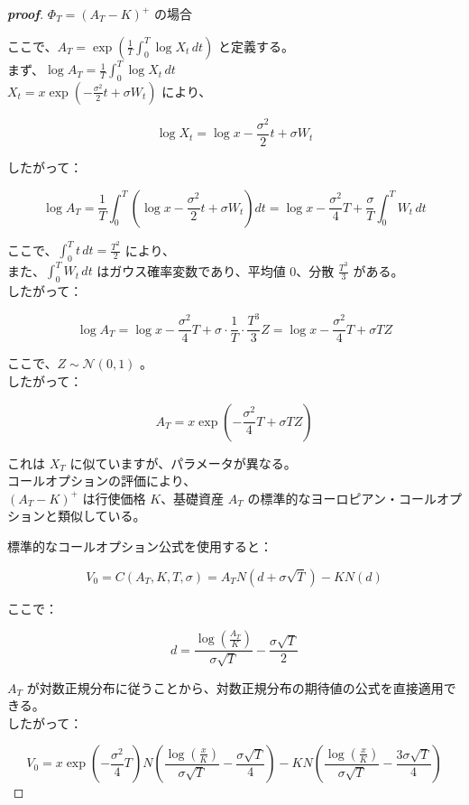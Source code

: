 \documentclass[a4paper,11pt]{jsarticle}
\begin{document}
\begin{proof}[\textbf{proof}]
$\Phi_T = (A_T - K)^+$ の場合

  ここで、$A_T = \exp\left(\frac{1}{T} \int_0^T \log X_t \, dt\right)$ と定義する。  \\ 
  
  まず、$\log A_T = \frac{1}{T} \int_0^T \log X_t \, dt$ \\  
  
  $X_t = x \exp\left(-\frac{\sigma^2}{2}t + \sigma W_t\right)$ により、  
  
  \[  
  \log X_t = \log x - \frac{\sigma^2}{2}t + \sigma W_t  
  \]  
  
  したがって：  
  
  \[  
  \log A_T = \frac{1}{T} \int_0^T \left(\log x - \frac{\sigma^2}{2}t + \sigma W_t\right) dt = \log x - \frac{\sigma^2}{4}T + \frac{\sigma}{T} \int_0^T W_t \, dt  
  \]  
  
  ここで、$\int_0^T t \, dt = \frac{T^2}{2}$ により、\\  
  
  また、$\int_0^T W_t \, dt$ はガウス確率変数であり、平均値 0、分散 $\frac{T^3}{3}$ がある。\\  
  
  したがって：  
  
  \[  
  \log A_T = \log x - \frac{\sigma^2}{4}T + \sigma \cdot \frac{1}{T} \cdot \frac{T^3}{3} Z = \log x - \frac{\sigma^2}{4}T + \sigma TZ  
  \]  
  
  ここで、$Z \sim \mathcal{N}(0,1)$ 。\\  
  
  したがって：  
  
  \[  
  A_T = x \exp\left(-\frac{\sigma^2}{4}T + \sigma TZ\right)  
  \]  
  
  これは $X_T$ に似ていますが、パラメータが異なる。\\  
  
  コールオプションの評価により、\\
  
  $(A_T - K)^+$ は行使価格 $K$、基礎資産 $A_T$ の標準的なヨーロピアン・コールオプションと類似している。  
  
  標準的なコールオプション公式を使用すると：  
  
  \[  
  V_0 = C(A_T, K, T, \sigma) = A_T N\left(d + \sigma\sqrt{T}\right) - K N(d)  
  \]  
  
  ここで：  
  
  \[  
  d = \frac{\log\left(\frac{A_T}{K}\right)}{\sigma\sqrt{T}} - \frac{\sigma\sqrt{T}}{2}  
  \]  
   
  
  $A_T$ が対数正規分布に従うことから、対数正規分布の期待値の公式を直接適用できる。\\  
  
  したがって：  
  
  \[  
  V_0 = x \exp\left(-\frac{\sigma^2}{4}T\right) N\left(\frac{\log\left(\frac{x}{K}\right)}{\sigma\sqrt{T}} - \frac{\sigma\sqrt{T}}{4}\right) - K N\left(\frac{\log\left(\frac{x}{K}\right)}{\sigma\sqrt{T}} - \frac{3\sigma\sqrt{T}}{4}\right)  
  \]
\end{proof}
\end{document}
